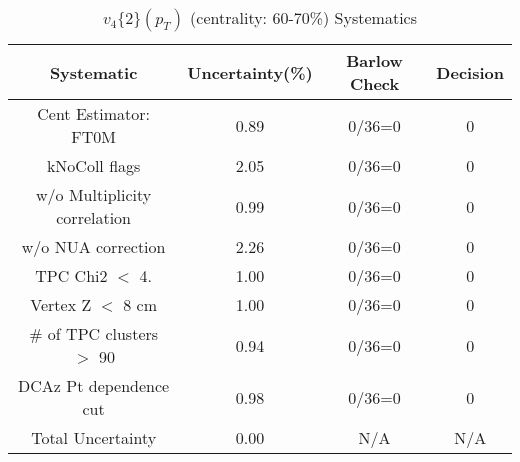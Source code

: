 \begin{table}[htbp]
\caption{$v_4\{2\}(p_{T})$ (centrality: 60-70\%) Systematics}
\label{tab:Sys_pTDiffv4}
\centering
\begin{tabular}{|c|c|c|c|}
\hline
Systematic & Uncertainty(\%) & Barlow Check & Decision \\
\hline
Cent Estimator: FT0M & 0.89 & 0/36=0 & 0 \\
kNoColl flags & 2.05 & 0/36=0 & 0 \\
w/o Multiplicity correlation & 0.99 & 0/36=0 & 0 \\
w/o NUA correction & 2.26 & 0/36=0 & 0 \\
TPC Chi2 $<$ 4. & 1.00 & 0/36=0 & 0 \\
Vertex Z $<$ 8 cm & 1.00 & 0/36=0 & 0 \\
\# of TPC clusters $>$ 90 & 0.94 & 0/36=0 & 0 \\
DCAz Pt dependence cut & 0.98 & 0/36=0 & 0 \\
\hline
Total Uncertainty & 0.00 & N/A & N/A \\
\hline
\end{tabular}
\end{table}
